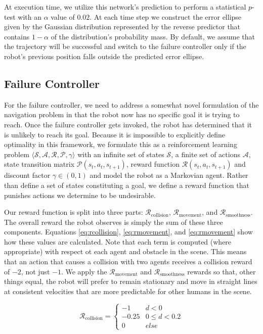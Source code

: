 \documentclass[letterpaper, 10 pt, conference]{ieeeconf}  %
\begin{document}
		At execution time, we utilize this network's prediction to perform a statistical $p$-test with an $\alpha$ value of $0.02$. At each time step we construct the error ellipse given by the Gaussian distribution represented by the reverse predictor that contains $1-\alpha$ of the distribution's probability mass. By default, we assume that the trajectory will be successful and switch to the failure controller only if the robot's previous position falls outside the predicted error ellipse.
	
	\subsection{Failure Controller}
		For the failure controller, we need to address a somewhat novel formulation of the navigation problem in that the robot now has no specific goal it is trying to reach. Once the failure controller gets invoked, the robot has determined that it is unlikely to reach its goal. Because it is impossible to explicitly define optimality in this framework, we formulate this as a reinforcement learning problem $\langle\mathcal{S}, \mathcal{A}, \mathcal{R}, \mathcal{P}, \gamma\rangle$ with an infinite set of states $\mathcal{S}$, a finite set of actions $\mathcal{A}$, state transition matrix $\mathcal{P}(s_t, a_t, s_{t+1})$, reward function $\mathcal{R}(s_t, a_t, s_{t+1})$ and discount factor $\gamma \in (0, 1)$ \cite{suttonandbarto} and model the robot as a Markovian agent. Rather than define a set of states constituting a goal, we define a reward function that punishes actions we determine to be undesirable. 
		
		Our reward function is split into three parts: $\mathcal{R}_{\text{collision}}$, $\mathcal{R}_{\text{movement}}$, and $\mathcal{R}_{\text{smoothness}}$. The overall reward the robot observes is simply the sum of these three components. Equations \ref{eq:rcollision}, \ref{eq:rmovement}, and \ref{eq:rmovement} show how these values are calculated. Note that each term is computed (where appropriate) with respect ot each agent and obstacle in the scene. This means that an action that causes a collision with two agents receives a collision reward of $-2$, not just $-1$. We apply the $\mathcal{R}_{\text{movement}}$ and $\mathcal{R}_{\text{smoothness}}$ rewards so that, other things equal, the robot will prefer to remain stationary and move in straight lines at consistent velocities that are more predictable for other humans in the scene.
		
		\begin{equation}\label{eq:rcollision}
			\mathcal{R}_{\text{collision}} = \begin{cases}
				-1      &   d < 0\\
				-0.25   &   0 \leq d < 0.2\\
				0       &   else
			\end{cases}
		\end{equation}
		
\end{document}
